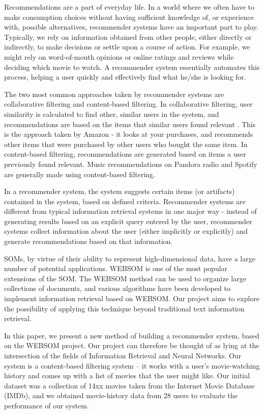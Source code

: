 \documentclass[conference]{IEEEtran}
\begin{document}
Recommendations are a part of everyday life. In a world where we often have to make consumption choices without having sufficient knowledge of, or experience with, possible alternatives, recommender systems have an important part to play. Typically, we rely on information obtained from other people, either directly or indirectly, to make decisions or settle upon a course of action. For example, we might rely on word-of-mouth opinions or online ratings and reviews while deciding which movie to watch. A recommender system essentially automates this process, helping a user quickly and effectively find what he/she is looking for.

The two most common approaches taken by recommender systems are collaborative filtering and content-based filtering. In collaborative filtering, user similarity is calculated to find other, similar users in the system, and recommendations are based on the items that similar users found relevant . This is the approach taken by Amazon - it looks at your purchases, and recommends other items that were purchased by other users who bought the same item. In content-based filtering, recommendations are generated based on items a user previously found relevant. Music recommendations on Pandora radio and Spotify are generally made using content-based filtering.

In a recommender system, the system suggests certain items (or artifacts) contained in the system, based on defined criteria. Recommender systems are different from typical information retrieval systems in one major way - instead of generating results based on an explicit query entered by the user, recommender systems collect information about the user (either implicitly or explicitly) and generate recommendations based on that information.

SOMs, by virtue of their ability to represent high-dimensional data, have a large number of potential applications. WEBSOM \cite{kaski1998websom} is one of the most popular extensions of the SOM. The WEBSOM method can be used to organize large collections of documents, and various algorithms have been developed to implement information retrieval based on WEBSOM. Our project aims to explore the possibility of applying this technique beyond traditional text information retrieval.

In this paper, we present a new method of building a recommender system, based on the WEBSOM project. Our project can therefore be thought of as lying at the intersection of the fields of Information Retrieval and Neural Networks. Our system is a content-based filtering system – it works with a user's movie-watching history and comes up with a list of movies that the user might like. Our initial dataset was a collection of 14xx movies taken from the Internet Movie Database (IMDb), and we obtained movie-history data from 28 users to evaluate the performance of our system.
\end{document}
